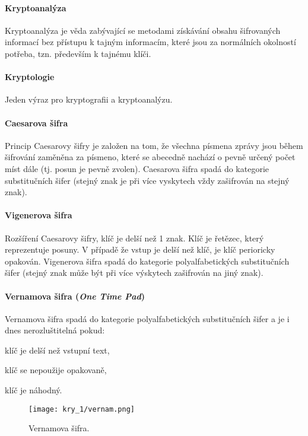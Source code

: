 \paragraph*{Kryptoanalýza} Kryptoanalýza je věda zabývající se metodami získávání obsahu šifrovaných informací bez přístupu k tajným informacím, které jsou za normálních okolností potřeba, tzn. především k tajnému klíči.

\paragraph*{Kryptologie} Jeden výraz pro kryptografii a kryptoanalýzu.

\paragraph*{Caesarova šifra} Princip Caesarovy šifry je založen na tom, že všechna písmena zprávy jsou během šifrování zaměněna za písmeno, které se abecedně nachází o pevně určený počet míst dále (tj. posun je pevně zvolen). Caesarova šifra spadá do kategorie substitučních šifer (stejný znak je při více vyskytech vždy zašifrován na stejný znak).

\paragraph*{Vigenerova šifra} Rozšíření Caesarovy šifry, klíč je delší než 1 znak. Klíč je řetězec, který reprezentuje posuny. V případě že vstup je delší než klíč, je klíč perioricky opakován. Vigenerova šifra spadá do kategorie polyalfabetických substitučních šifer (stejný znak může být při více výskytech zašifrován na jiný znak).

\paragraph*{Vernamova šifra (\textit{One Time Pad})} Vernamova šifra spadá do kategorie polyalfabetických substitučních šifer a je i dnes nerozluštitelná pokud: \begin{compactitem}
    \item klíč je delší než vstupní text,
    \item klíč se nepoužije opakovaně,
    \item klíč je náhodný.
\end{compactitem}

\begin{figure}[H]
    \centering
    \texttt{[image: kry\_1/vernam.png]}
    \caption{Vernamova šifra.}
\end{figure}

